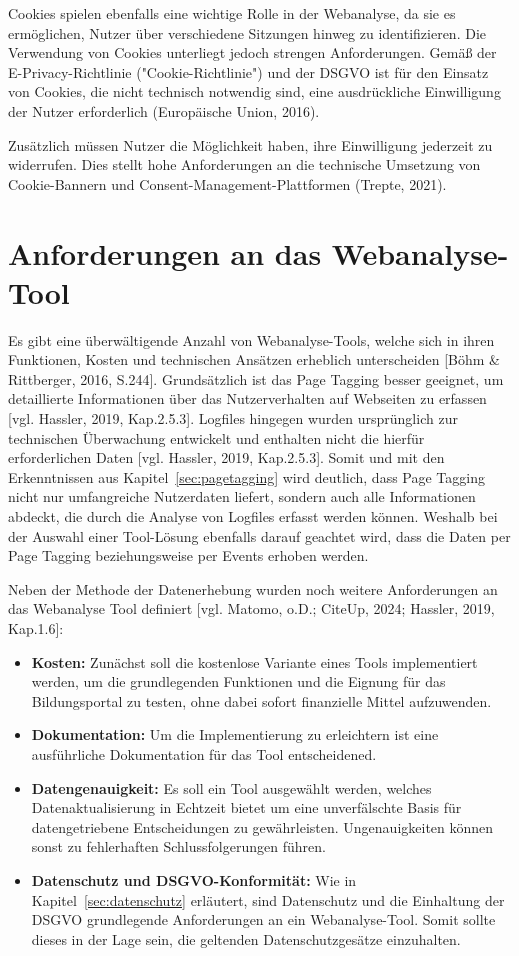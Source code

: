 Cookies spielen ebenfalls eine wichtige Rolle in der Webanalyse, da sie es ermöglichen, Nutzer über verschiedene Sitzungen hinweg zu identifizieren. Die Verwendung von Cookies unterliegt jedoch strengen Anforderungen. Gemäß der E-Privacy-Richtlinie ("Cookie-Richtlinie") und der DSGVO ist für den Einsatz von Cookies, die nicht technisch notwendig sind, eine ausdrückliche Einwilligung der Nutzer erforderlich (Europäische Union, 2016). %

Zusätzlich müssen Nutzer die Möglichkeit haben, ihre Einwilligung jederzeit zu widerrufen. Dies stellt hohe Anforderungen an die technische Umsetzung von Cookie-Bannern und Consent-Management-Plattformen (Trepte, 2021).

\section{Anforderungen an das Webanalyse-Tool} %
\label{sec:anforderungenWebanalyseTool}
Es gibt eine überwältigende Anzahl von Webanalyse-Tools, welche sich in ihren Funktionen, Kosten und technischen Ansätzen erheblich unterscheiden [Böhm \& Rittberger, 2016, S.244]. Grundsätzlich ist das Page Tagging besser geeignet, um detaillierte Informationen über das Nutzerverhalten auf Webseiten zu erfassen [vgl. Hassler, 2019, Kap.2.5.3]. Logfiles hingegen wurden ursprünglich zur technischen Überwachung entwickelt und enthalten nicht die hierfür erforderlichen Daten [vgl. Hassler, 2019, Kap.2.5.3]. Somit und mit den Erkenntnissen aus Kapitel~\ref{sec:pagetagging} wird deutlich, dass Page Tagging nicht nur umfangreiche Nutzerdaten liefert, sondern auch alle Informationen abdeckt, die durch die Analyse von Logfiles erfasst werden können. Weshalb bei der Auswahl einer Tool-Lösung ebenfalls darauf geachtet wird, dass die Daten per Page Tagging beziehungsweise per Events erhoben werden. 

Neben der Methode der Datenerhebung wurden noch weitere Anforderungen an das Webanalyse Tool definiert [vgl. Matomo, o.D.; CiteUp, 2024; Hassler, 2019, Kap.1.6]:

\begin{itemize}
    \item \textbf{Kosten:} Zunächst soll die kostenlose Variante eines Tools implementiert werden, um die grundlegenden Funktionen und die Eignung für das Bildungsportal zu testen, ohne dabei sofort finanzielle Mittel aufzuwenden.
    \item \textbf{Dokumentation:} Um die Implementierung zu erleichtern ist eine ausführliche Dokumentation für das Tool entscheidened.
    \item \textbf{Datengenauigkeit:} Es soll ein Tool ausgewählt werden, welches Datenaktualisierung in Echtzeit bietet um eine unverfälschte Basis für datengetriebene Entscheidungen zu gewährleisten. Ungenauigkeiten können sonst zu fehlerhaften Schlussfolgerungen führen.
    \item \textbf{Datenschutz und DSGVO-Konformität:} Wie in Kapitel~\ref{sec:datenschutz} erläutert, sind Datenschutz und die Einhaltung der DSGVO grundlegende Anforderungen an ein Webanalyse-Tool. Somit sollte dieses in der Lage sein, die geltenden Datenschutzgesätze einzuhalten.
\end{itemize}

